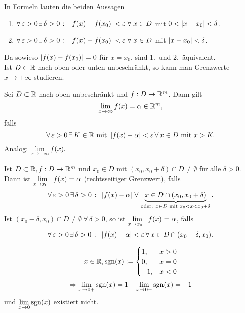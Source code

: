 \documentclass[../ana1.tex]{subfiles}
\begin{document}
\begin{bew}
    In Formeln lauten die beiden Aussagen 
    \begin{enumerate}
        \item \( \forall \, \varepsilon > 0 \,\exists \, \delta > 0
        \; \colon \; \left| f(x) - f(x_0) \right| < \varepsilon \;\forall \;
        x \in D \) mit \( 0 < \left|x-x_0\right| < \delta \).
        \item \( \forall \, \varepsilon > 0 \,\exists \, \delta > 0
        \; \colon \; \left| f(x) - f(x_0) \right| < \varepsilon \;\forall \;
        x \in D \) mit \( \left|x-x_0\right| < \delta \).
    \end{enumerate}
    Da sowieso \( \left|f(x) -f(x_0)\right| = 0 \) für \( x=x_0 \), sind 1.\ und
    2.\ äquivalent.\\
    Ist \( D\subset \mathbb{R} \) nach oben oder unten unbeschränkt, so 
    kann man Grenzwerte \( x \rightarrow \pm \infty \) studieren.
\end{bew}
\begin{defi}
    Sei \( D \subset \mathbb{R} \) nach oben unbeschränkt und 
    \( f:D\rightarrow \mathbb{R}^m \). Dann gilt 
    \[ \lim\limits_{x\rightarrow\infty} f(x) = \alpha \in \mathbb{R}^m, \]
    falls
    \[ \forall \,\varepsilon > 0 \,\exists \, K\in\mathbb{R} \text{ mit } 
    \left|f(x) - \alpha\right| < \varepsilon \,\forall \, x \in D 
    \text{ mit } x > K. \]
    Analog: \( \lim\limits_{x\rightarrow -\infty} f(x). \)
\end{defi}
\begin{defi}
    Ist \( D \subset \mathbb{R}, f : D\rightarrow \mathbb{R}^m \) und \( x_0 \in D \)
    mit \( (x_0, x_0 + \delta) \cap D \neq \emptyset \) für alle 
    \( \delta > 0 \). Dann ist \( \lim\limits_{x\rightarrow x_0+} f(x) = \alpha \) 
    (rechtsseitiger Grenzwert), falls
    \[ \forall \,\varepsilon > 0 \,\exists \, \delta > 0 \;\colon \;
    \left| f(x) - \alpha \right| \,\forall \, \underbrace{ x\in D \cap 
    (x_0, x_0 + \delta) }_{ \text{oder: } x\in D \text{ mit } 
    x_0 < x < x_0 + \delta }. \]
    Ist \( (x_0 - \delta, x_0) \cap D \neq \emptyset \,\forall \, 
    \delta > 0 \), so ist \( \lim\limits_{x\rightarrow x_0-} f(x) = \alpha \), falls
    \[ \forall \, \varepsilon > 0 \,\exists \, \delta > 0 \;\colon \; 
    \left|f(x) - \alpha\right| < \varepsilon \,\forall \, x \in D \cap 
    (x_0 - \delta, x_0). \]
\end{defi}
\begin{bsp}
    \[ x\in\mathbb{R}, \mathrm{sgn}(x) := 
    \begin{cases}
        1,  &x>0\\
        0,  &x=0\\
        -1, &x<0
    \end{cases} \]
    \[ \Rightarrow \lim\limits_{x\rightarrow 0+} \mathrm{sgn}(x) = 1 \quad \lim\limits_{x\rightarrow 0-} \mathrm{sgn}(x) = -1 \]
    und \( \lim\limits_{x\rightarrow 0} \mathrm{sgn}(x) \) existiert nicht.
\end{bsp}
\end{document}
